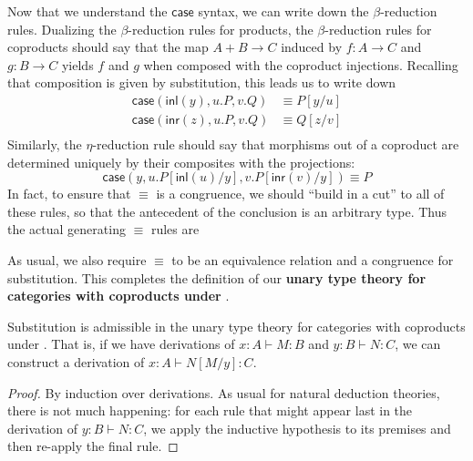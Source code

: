 \documentclass{book}
\let\types\vdash
\def\inl{\mathsf{inl}}
\def\inr{\mathsf{inr}}
\def\case{\mathsf{case}}
\begin{document}
Now that we understand the $\case$ syntax, we can write down the $\beta$-reduction rules.
Dualizing the $\beta$-reduction rules for products, the $\beta$-reduction rules for coproducts should say that the map $A+B\to C$ induced by $f:A\to C$ and $g:B\to C$ yields $f$ and $g$ when composed with the coproduct injections.
Recalling that composition is given by substitution, this leads us to write down
\begin{align*}
  \case(\inl(y),u.P,v.Q) &\equiv P[y/u]\\
  \case(\inr(z),u.P,v.Q) &\equiv Q[z/v]\\
\end{align*}
Similarly, the $\eta$-reduction rule should say that morphisms out of a coproduct are determined uniquely by their composites with the projections:
\[ \case(y,u.P[\inl(u)/y],v.P[\inr(v)/y]) \equiv P \]
In fact, to ensure that $\equiv$ is a congruence, we should ``build in a cut'' to all of these rules, so that the antecedent of the conclusion is an arbitrary type.
Thus the actual generating $\equiv$ rules are
As usual, we also require $\equiv$ to be an equivalence relation and a congruence for substitution.
This completes the definition of our \textbf{unary type theory for categories with coproducts under \cG}.

\begin{lem}\label{thm:catcoprod-subadm}
  Substitution is admissible in the unary type theory for categories with coproducts under \cG.
  That is, if we have derivations of $x:A\types M:B$ and $y:B\types N:C$, we can construct a derivation of $x:A\types N[M/y]:C$.
\end{lem}
\begin{proof}
  By induction over derivations.
  As usual for natural deduction theories, there is not much happening: for each rule that might appear last in the derivation of $y:B\types N:C$, we apply the inductive hypothesis to its premises and then re-apply the final rule.
\end{proof}
\end{document}
